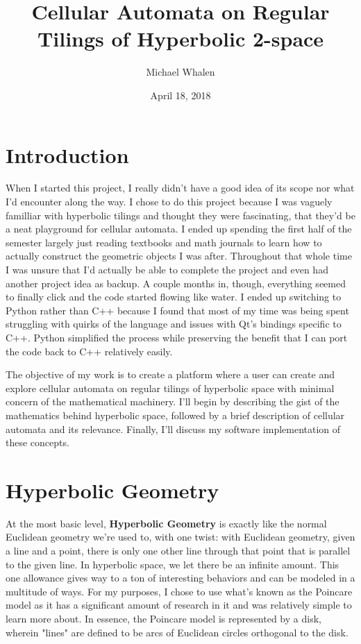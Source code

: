 \documentclass[letterpaper,12pt]{article}
\begin{document}
\doublespacing
\title{Cellular Automata on Regular Tilings of Hyperbolic 2-space}
\author{Michael Whalen}
\date{April 18, 2018}
\maketitle
\setlength{\parindent}{4em}

\section*{Introduction}

When I started this project, I really didn't have a good idea of its scope nor what I'd encounter along the way. I chose to do this project because I was vaguely familliar with hyperbolic tilings and thought they were fascinating, that they'd be a neat playground for cellular automata. I ended up spending the first half of the semester largely just reading textbooks and math journals to learn how to actually construct the geometric objects I was after. Throughout that whole time I was unsure that I'd actually be able to complete the project and even had another project idea as backup. A couple months in, though, everything seemed to finally click and the code started flowing like water. I ended up switching to Python rather than C++ because I found that most of my time was being spent struggling with quirks of the language and issues with Qt's bindings specific to C++. Python simplified the process while preserving the benefit that I can port the code back to C++ relatively easily.

The objective of my work is to create a platform where a user can create and explore cellular automata on regular tilings of hyperbolic space with minimal concern of the mathematical machinery.
I'll begin by describing the gist of the mathematics behind hyperbolic space, followed by a brief description of cellular automata and its relevance. Finally, I'll discuss my software implementation of these concepts.

\section*{Hyperbolic Geometry}

At the most basic level, \textbf{Hyperbolic Geometry} is exactly like the normal Euclidean geometry we're used to, with one twist: with Euclidean geometry, given a line and a point, there is only one other line through that point that is parallel to the given line. In hyperbolic space, we let there be an infinite amount. This one allowance gives way to a ton of interesting behaviors and can be modeled in a multitude of ways. For my purposes, I chose to use what's known as the Poincare model as it has a significant amount of research in it and was relatively simple to learn more about. In essence, the Poincare model is represented by a disk, wherein "lines" are defined to be arcs of Euclidean circles orthogonal to the disk.
\end{document}
